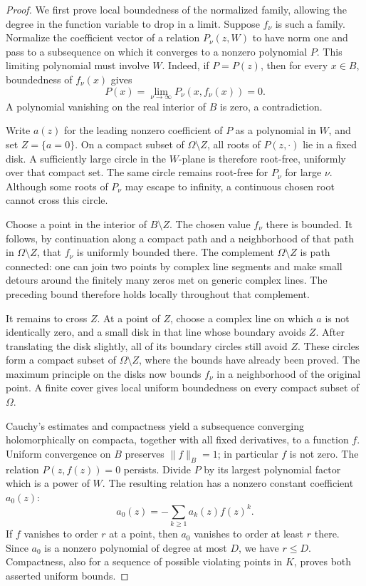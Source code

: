 \begin{proof}
We first prove local boundedness of the normalized family, allowing the
degree in the function variable to drop in a limit.  Suppose \(f_\nu\) is
such a family.  Normalize the coefficient vector of a relation
\(P_\nu(z,W)\) to have norm one and pass to a subsequence on which it
converges to a nonzero polynomial \(P\).  This limiting polynomial must
involve \(W\).  Indeed, if \(P=P(z)\), then for every \(x\in B\), boundedness
of \(f_\nu(x)\) gives
\[
 P(x)=\lim_{\nu\to\infty}P_\nu(x,f_\nu(x))=0.
\]
A polynomial vanishing on the real interior of \(B\) is zero, a
contradiction.

Write \(a(z)\) for the leading nonzero coefficient of \(P\) as a polynomial
in \(W\), and set \(Z=\{a=0\}\).  On a compact subset of \(\Omega\setminus Z\),
all roots of \(P(z,\cdot)\) lie in a fixed disk.  A sufficiently large
circle in the \(W\)-plane is therefore root-free, uniformly over that
compact set.  The same circle remains root-free for \(P_\nu\) for large
\(\nu\).  Although some roots of \(P_\nu\) may escape to infinity, a
continuous chosen root cannot cross this circle.

Choose a point in the interior of \(B\setminus Z\).  The chosen value
\(f_\nu\) there is bounded.  It follows, by continuation along a compact
path and a neighborhood of that path in \(\Omega\setminus Z\), that
\(f_\nu\) is uniformly bounded there.  The complement
\(\Omega\setminus Z\) is path connected: one can join two points by
complex line segments and make small detours around the finitely many
zeros met on generic complex lines.  The preceding bound therefore
holds locally throughout that complement.

It remains to cross \(Z\).  At a point of \(Z\), choose a complex line
on which \(a\) is not identically zero, and a small disk in that line
whose boundary avoids \(Z\).  After translating the disk slightly, all
of its boundary circles still avoid \(Z\).  These circles form a compact
subset of \(\Omega\setminus Z\), where the bounds have already been
proved.  The maximum principle on the disks now bounds \(f_\nu\) in a
neighborhood of the original point.  A finite cover gives local uniform
boundedness on every compact subset of \(\Omega\).

Cauchy's estimates and compactness yield a subsequence converging
holomorphically on compacta, together with all fixed derivatives, to a
function \(f\).  Uniform convergence on \(B\) preserves \(\|f\|_B=1\);
in particular \(f\) is not zero.  The relation \(P(z,f(z))=0\) persists.
Divide \(P\) by its largest polynomial factor which is a power of \(W\).
The resulting relation has a nonzero constant coefficient \(a_0(z)\):
\[
 a_0(z)=-\sum_{k\ge1}a_k(z)f(z)^k.
\]
If \(f\) vanishes to order \(r\) at a point, then \(a_0\) vanishes to
order at least \(r\) there.  Since \(a_0\) is a nonzero polynomial of
degree at most \(D\), we have \(r\le D\).  Compactness, also for a sequence
of possible violating points in \(K\), proves both asserted uniform
bounds.


\end{proof}
